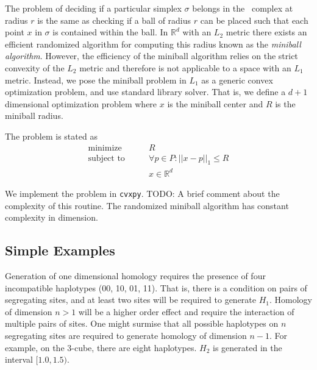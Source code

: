 The problem of deciding if a particular simplex $\sigma$ belongs in the \Cech\ complex at radius $r$ is the same as checking if a ball of radius $r$ can be placed such that each point $x$ in $\sigma$ is contained within the ball.
In $\mathbb{R}^d$ with an $L_2$ metric there exists an efficient randomized algorithm for computing this radius known as the \emph{miniball algorithm}.\autocite{Gartner:1999}
However, the efficiency of the miniball algorithm relies on the strict convexity of the $L_2$ metric and therefore is not applicable to a space with an $L_1$ metric.
Instead, we pose the miniball problem in $L_1$ as a generic convex optimization problem, and use standard library solver.
That is, we define a $d+1$ dimensional optimization problem where $x$ is the miniball center and $R$ is the miniball radius.

The problem is stated as
\begin{align*}
\text{minimize}\qquad   &  R \\
\text{subject to}\qquad & \forall p \in P: ||x-p||_{1} \leq R \\
                        & x \in \mathbb{R}^d
\end{align*}

We implement the problem in \texttt{cvxpy}.
TODO: A brief comment about the complexity of this routine.
The randomized miniball algorithm has constant complexity in dimension.

\subsection{Simple Examples}
\label{subsec:higher_dim_examples}
%
Generation of one dimensional homology requires the presence of four incompatible haplotypes (00, 10, 01, 11).
That is, there is a condition on pairs of segregating sites, and at least two sites will be required to generate $H_1$.
Homology of dimension $n>1$ will be a higher order effect and require the interaction of multiple pairs of sites.
One might surmise that all possible haplotypes on $n$ segregating sites are required to generate homology of dimension $n-1$.
For example, on the 3-cube, there are eight haplotypes.
$H_2$ is generated in the interval $[1.0,1.5)$.

